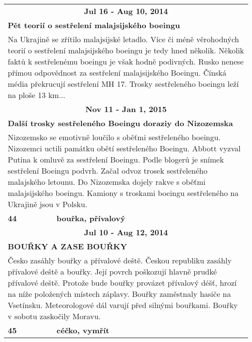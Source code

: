 \begin{tabularx}{\linewidth}{l l}
                \multicolumn{2}{c}{\bf Jul 16 - Aug 10, 2014} \\
                \multicolumn{2}{p{\linewidth}}{\bf Pět teorií o sestřelení malajsijského boeingu} \\
                \multicolumn{2}{p{\linewidth}}{Na Ukrajině se zřítilo malajsijské letadlo. Více či méně věrohodných teorií o sestřelení malajsijského boeingu je tedy hned několik. Několik faktů k sestřelenému boeingu je však hodně podivných. Rusko nenese přímou odpovědnost za sestřelení malajsijského Boeingu. Čínská média překrucují sestřelení MH 17. Trosky sestřeleného boeingu leží na ploše 13 km...} \\ \midrule
                
                \multicolumn{2}{c}{\bf Nov 11 - Jan 1, 2015} \\
                \multicolumn{2}{p{\linewidth}}{\bf Další trosky sestřeleného Boeingu doraziy do Nizozemska} \\
                \multicolumn{2}{p{\linewidth}}{Nizozemsko se emotivně loučilo s oběťmi sestřeleného boeingu. Nizozemci uctili památku obětí sestřeleného Boeingu. Abbott vyzval Putina k omluvě za sestřelení Boeingu. Podle blogerů je snímek sestřelení Boeingu podvrh. Začal odvoz trosek sestřeleného malajského letounu. Do Nizozemska dojely rakve s oběťmi malajsijského boeingu. Kamiony s troskami boeingu sestřeleného na Ukrajině jsou v Polsku.} \\ \midrule
                [1.5pt]

            \bf 44 & \bf bouřka, přívalový \\ \midrule
            
                \multicolumn{2}{c}{\bf Jul 10 - Aug 12, 2014} \\
                \multicolumn{2}{p{\linewidth}}{\bf BOUŘKY A ZASE BOUŘKY} \\
                \multicolumn{2}{p{\linewidth}}{Česko zasáhly bouřky a přívalové deště. Českou republiku zasáhly přívalové deště a bouřky. Její povrch poškozují hlavně prudké přívalové deště. Protože bude bouřky provázet přívalový déšť, hrozí na níže položených místech záplavy. Bouřky zaměstnaly hasiče na Vsetínsku. Meteorologové dál varují před silnými bouřkami. Bouřky v sobotu zaskočily Moravu.} \\ \midrule
                [1.5pt]

            \bf 45 & \bf céčko, vymřít \\ \midrule
            

\end{tabularx}
